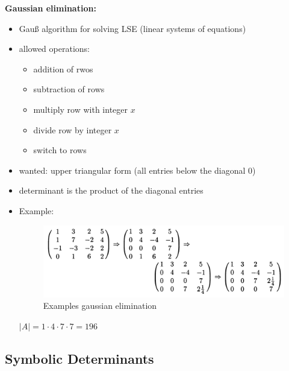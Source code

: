 \documentclass[a4]{scrartcl}
\begin{document}
\textbf{Gaussian elimination:}
\begin{itemize}
\item Gauß algorithm for solving LSE (linear systems of equations)
\item allowed operations:
\begin{itemize}
\item addition of rwos
\item subtraction of rows
\item multiply row with integer $x$
\item divide row by integer $x$
\item switch to rows
\end{itemize}
\item wanted: upper triangular form (all entries below the diagonal 0)
\item determinant is the product of the diagonal entries
\item Example:
\begin{figure}[H]
\begin{center}
\includegraphics[scale=0.4]{gauss.jpg}
\end{center}
\caption{Examples gaussian elimination \cite{book}}
\end{figure}
$|A| = 1 \cdot 4 \cdot 7 \cdot 7 = 196$
\end{itemize}



























\subsection*{Symbolic Determinants}
\end{document}
